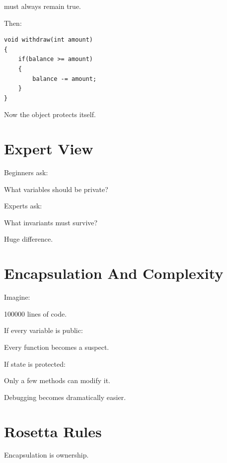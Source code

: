 \documentclass[11pt,a4paper]{book}
\begin{document}
must always remain true.

Then:

\begin{verbatim}
void withdraw(int amount)
{
    if(balance >= amount)
    {
        balance -= amount;
    }
}
\end{verbatim}

Now the object protects itself.


\section{Expert View}

Beginners ask:

\begin{center}
What variables should be private?
\end{center}

Experts ask:

\begin{center}
What invariants must survive?
\end{center}

Huge difference.


\section{Encapsulation And Complexity}

Imagine:

100000 lines of code.

If every variable is public:

Every function becomes a suspect.

If state is protected:

Only a few methods can modify it.

Debugging becomes dramatically easier.


\section{Rosetta Rules}

\begin{rosettarule}

Encapsulation is ownership.

\end{rosettarule}
\end{document}
